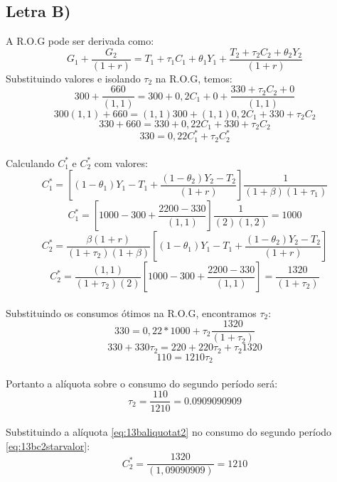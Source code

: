 \documentclass{article}
\begin{document}
\subsection*{Letra B)}
A R.O.G pode ser derivada como:
\begin{equation}\label{eq:13brog}
    G_1+\frac{G_2}{(1+r)}=T_1+\tau_1 C_1+\theta_1 Y_1+\frac{T_2+\tau_2 C_2+\theta_2 Y_2}{(1+r)}
\end{equation}
Substituindo valores e isolando $\tau_2$ na R.O.G, temos:
\begin{equation}
    300+\frac{660}{(1,1)}=300+0,2 C_1+0+\frac{330+\tau_2 C_2+0}{(1,1)}
\end{equation}
\begin{equation}
    300(1,1)+660=(1,1)300+(1,1)0,2 C_1+330+\tau_2 C_2
\end{equation}
\begin{equation}
    330+660=330+0,22 C_1+330+\tau_2 C_2
\end{equation}
\begin{equation}
    330=0,22 C_1^*+\tau_2 C_2^*
\end{equation}
\\ 
Calculando $C_1^*$ e $C_2^*$ com valores:
\begin{equation}
    C_1^*=\left[(1-\theta_1)Y_1-T_1+\frac{(1-\theta_2)Y_2-T_2}{(1+r)}\right]\frac{1}{(1+\beta)(1+\tau_1)}
\end{equation}
\begin{equation}\label{eq:13bc1starvalor}
    C_1^*=\left[1000-300+\frac{2200-330}{(1,1)}\right]\frac{1}{(2)(1,2)} = 1000
\end{equation}
\begin{equation}
    C_2^*=\frac{\beta(1+r)}{(1+\tau_2)(1+\beta)}\left[(1-\theta_1)Y_1-T_1+\frac{(1-\theta_2)Y_2-T_2}{(1+r)}\right]
\end{equation}
\begin{equation}\label{eq:13bc2starvalor}
    C_2^*=\frac{(1,1)}{(1+\tau_2)(2)}\left[1000-300+\frac{2200-330}{(1,1)}\right]=\frac{1320}{(1+\tau_2)}
\end{equation}
\\
Substituindo os consumos ótimos na R.O.G, encontramos $\tau_2$:
\begin{equation}
    330=0,22 *1000+\tau_2 \frac{1320}{(1+\tau_2)}
\end{equation}
\begin{equation}
    330+330\tau_2=220+220\tau_2+\tau_2 1320
\end{equation}
\begin{equation}
    110=1210\tau_2
\end{equation}
\\
Portanto a alíquota sobre o consumo do segundo período será:
\begin{equation}\label{eq:13baliquotat2}
    \tau_2=\frac{110}{1210}=0.0909090909
\end{equation}
\\
Substituindo a alíquota \eqref{eq:13baliquotat2} no consumo do segundo período \eqref{eq:13bc2starvalor}:
\begin{equation}\label{eq:13bc2starvalorfinal}
    C_2^*=\frac{1320}{(1,09090909)} = 1210
\end{equation}
\end{document}
